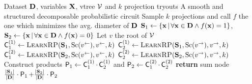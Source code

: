 \begin{algorithm}[t]
  \caption{}\label{alg:learnrp}
  \begin{algorithmic}[1]
    \Require Dataset $\mathbf{D}$, variables $\mathbf{X}$, vtree $\operatorname{\mathcal{V}}$ and $k$ projection tryouts
    \Ensure A smooth and structured decomposable probabilistic circuit
    \label{alg:learnrp:line:input}
    \NIElse
      \State Sample $k$ projections and call $f$ the one which minimizes the avg. diameter of $\mathbf{D}$
      \State $\mathbf{S}_1\gets\{\mathbf{x}\,|\,\forall\mathbf{x}\in\mathbf{D}\wedge f(\mathbf{x})=1\}$,
        $\mathbf{S}_2\gets\{\mathbf{x}\,|\,\forall\mathbf{x}\in\mathbf{D}\wedge f(\mathbf{x})=0\}$
        \State Let $v$ the root of $\operatorname{\mathcal{V}}$ \label{alg:learnrp:line:vtree}
      \State $\Child^{(1)}_1\gets\Call{LearnRP}{\set{S}_1,\Sc(v^\gets),v^\gets,k}$
      \State $\Child^{(1)}_2\gets\Call{LearnRP}{\set{S}_1,\Sc(v^\to),v^\to,k}$
      \State $\Child^{(2)}_1\gets\Call{LearnRP}{\set{S}_2,\Sc(v^\gets),v^\gets,k}$
      \State $\Child^{(2)}_2\gets\Call{LearnRP}{\set{S}_2,\Sc(v^\to),v^\to,k}$
      \State Construct products $\operatorname{\textup{\textsf{P}}}_1\gets\operatorname{\textup{\textsf{C}}}^{(1)}_1\cdot\operatorname{\textup{\textsf{C}}}^{(1)}_2$ and
        $\operatorname{\textup{\textsf{P}}}_2\gets\operatorname{\textup{\textsf{C}}}^{(2)}_1\cdot\operatorname{\textup{\textsf{C}}}^{(2)}_2$\label{alg:learnrp:line:prod}
      \State \textbf{return} sum node $\frac{|\mathbf{S}_1|}{|\mathbf{D}|}\cdot\operatorname{\textup{\textsf{P}}}_1+\frac{|\mathbf{S}_2|}{|\mathbf{D|}}\cdot\operatorname{\textup{\textsf{P}}}_2$
    \EndNIElse
  \end{algorithmic}
\end{algorithm}

